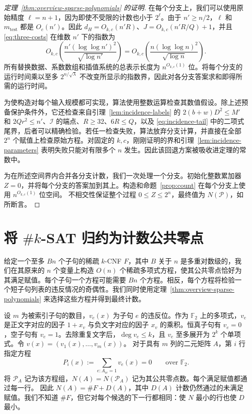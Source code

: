 \documentclass[11pt,reqno]{amsart}
\numberwithin{equation}{section}
\theoremstyle{definition}\newtheorem{definition}[theorem]{定义}
\theoremstyle{remark}\newtheorem{remark}[theorem]{注}
\renewcommand{\le}{\leqslant}
\renewcommand{\ge}{\geqslant}
\begin{document}
\begin{proof}[定理~\ref{thm:overview-sparse-polynomials} 的证明]
在每个分支上，我们可以使用原始精度 $\ell=n+1$，因为即使不受限的计数也小于 $2^\ell$。由于 $n'\ge n/2$，$\ell$ 和 $m_{\mathrm{test}}$ 都是 $O_c(n')$。因此 $d_H=O_{k,c}(n'R)$、$J=O_{k,c}(n'R/Q)+1$，并且 \eqref{eq:three-costs} 在维数 $n'$ 下的指数为
\[
 O_{k,c}\!\left(\frac{n'(\log\log n')^2}{\sqrt{\log n'}}\right)
 =O_{k,c}\!\left(\frac{n(\log\log n)^2}{\sqrt{\log n}}\right).
\]
所有替换数据、系数数组和插值系统的总表示长度为 $n^{O_{k,c}(1)}$ 位。将每个分支的运行时间乘以至多 $2^{n/\sqrt\lambda}$ 不改变所显示的指数界，因此对各分支答案求和即得所需的运行时间。

为使构造对每个输入规模都可实现，算法使用整数运算检查其数值假设。除上述预备保护条件外，它还检查来自引理~\ref{lem:incidence-labels} 的 $2(b+w)D^2\le M'$ 和 $2Qr^2\le n'$、$\mathcal I$ 的端点、$R\ge32$、$6R\le Q$，以及 \eqref{eq:incidence-tail} 中的二项式尾界，后者可以精确检验。若任一检查失败，算法放弃分支计算，并直接在全部 $2^n$ 个赋值上检查原始方程。对固定的 $k,c$，刚刚证明的界和引理~\ref{lem:incidence-parameters} 表明失败只能对有限多个 $n$ 发生。因此该回退方案被吸收进定理的常数中。

为在所述空间界内合并各分支计数，我们一次处理一个分支。初始化整数累加器 $Z=0$，并将每个分支的答案加到其上。构造和命题~\ref{prop:count} 在每个分支上使用 $n^{O_{k,c}(1)}$ 位空间。
不相交性保证整个过程 $0\le Z\le2^n$，最终值为 $N(\mathcal P)$，如所断言。
\end{proof}

\section{将 \texorpdfstring{$\#k$-SAT}{\#k-SAT} 归约为计数公共零点}\label{sec:hashes}\label{subsec:sparse-hashes}
给定一个至多 $Bn$ 个子句的稀疏 $k$-CNF $F$，其中 $B$ 关于 $n$ 是多重对数级的，我们在其原来的 $n$ 个变量上构造 $O(n)$ 个稀疏多项式方程，使其公共零点恰好为其满足赋值。每个子句一个方程可能需要 $Bn$ 个方程。相反，每个方程将检验一个短子句列表的违反情况的奇偶性。我们同时使用定理~\ref{thm:overview-sparse-polynomials} 来选择这些方程并得到最终计数。

设 $m$ 为被索引子句的数目，$v_e(x)$ 为子句 $e$ 的违反位。作为 $\mathbb F_2$ 上的多项式，$v_e$ 是正文字对应的因子 $1+x_v$ 与负文字对应的因子 $x_v$ 的乘积。恒真子句有 $v_e=0$，空子句有 $v_e=1$。去除重复文字后，$\deg v_e\le k$，且 $v_e$ 至多展开为 $2^k$ 个单项式。令 $v(x)=(v_1(x),\ldots,v_m(x))$。
对于具有 $m$ 列的二元矩阵 $A$，第 $i$ 行指定方程
\begin{equation}\label{eq:hash-query}
 P_i(x):=\sum_{e:A_{ie}=1} v_e(x)=0\qquad\text{over }\mathbb F_2.
\end{equation}
将 $\mathcal P_A$ 记为该方程组，$N(A)=N(\mathcal P_A)$ 记为其公共零点数。每个满足赋值都通过每一行。
因此 $N(A)=\#F+D(A)$，其中 $D(A)$ 计数仍然通过的未满足赋值。我们不知道 $\#F$，但它对每个候选的下一行都相同：使 $N$ 最小的行也使 $D$ 最小。
\end{document}
